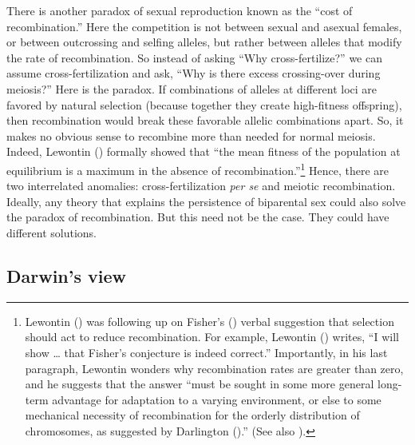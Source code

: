 \documentclass[
  letterpaper,
]{book}
\begin{document}
There is another paradox of sexual reproduction known as the ``cost of
recombination.'' Here the competition is not between sexual and asexual
females, or between outcrossing and selfing alleles, but rather between
alleles that modify the rate of recombination. So instead of asking
``Why cross-fertilize?'' we can assume cross-fertilization and ask,
``Why is there excess crossing-over during meiosis?'' Here is the
paradox. If combinations of alleles at different loci are favored by
natural selection (because together they create high-fitness offspring),
then recombination would break these favorable allelic combinations
apart. So, it makes no obvious sense to recombine more than needed for
normal meiosis. Indeed, Lewontin ()
formally showed that ``the mean fitness of the population at equilibrium
is a maximum in the absence of recombination.''\footnote{Lewontin
  () was following up on Fisher's
  () verbal suggestion that selection
  should act to reduce recombination. For example, Lewontin
  () writes, ``I will show \ldots{}
  that Fisher's conjecture is indeed correct.'' Importantly, in his last
  paragraph, Lewontin wonders why recombination rates are greater than
  zero, and he suggests that the answer ``must be sought in some more
  general long-term advantage for adaptation to a varying environment,
  or else to some mechanical necessity of recombination for the orderly
  distribution of chromosomes, as suggested by Darlington
  ().'' (See also
  ).} Hence, there are two
interrelated anomalies: cross-fertilization \emph{per se} and meiotic
recombination. Ideally, any theory that explains the persistence of
biparental sex could also solve the paradox of recombination. But this
need not be the case. They could have different solutions.

\subsection{Darwin's view}\label{darwins-view}
\end{document}
